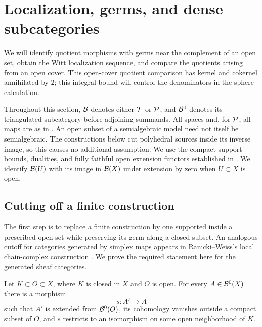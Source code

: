 \section{Localization, germs, and dense subcategories}
\label{sec:localization}

We will identify quotient morphisms with germs near the complement of
an open set, obtain the Witt localization sequence, and compare the
quotients arising from an open cover.  This open-cover quotient
comparison has kernel and cokernel annihilated by $2$; this integral
bound will control the denominators in the sphere calculation.

Throughout this section, $\mathcal B$ denotes either $\mathcal T$ or $\mathcal P$, and
$\mathcal B^0$ denotes its triangulated subcategory before adjoining summands.
All spaces and, for $\mathcal P$, all maps are as in
.  An open subset of a semialgebraic model need
not itself be semialgebraic.  The constructions below cut polyhedral
sources inside its inverse image, so this causes no additional assumption.
We use the compact support bounds, dualities, and fully faithful open
extension functors established in .
We identify $\mathcal B(U)$ with its image in $\mathcal B(X)$ under extension by zero
when $U\subset X$ is open.

\subsection{Cutting off a finite construction}

The first step is to replace a finite construction by one supported
inside a prescribed open set while preserving its germ along a closed
subset.  An analogous cutoff for categories generated by simplex maps
appears in Ranicki--Weiss's local chain-complex construction
\cite[author version, Lemma~4.14 and Corollary~4.15]{RanickiWeiss2010}.
We prove the required statement here for the generated sheaf categories.

\begin{lemma}[Cutoff]
\label{lem:cutoff}
Let $K\subset O\subset X$, where $K$ is closed in $X$ and $O$ is open.
For every $A\in\mathcal B^0(X)$ there is a morphism
\[
 s:A'\longrightarrow A
\]
such that $A'$ is extended from $\mathcal B^0(O)$, its cohomology vanishes
outside a compact subset of $O$, and $s$ restricts to an isomorphism on
some open neighborhood of $K$.
\end{lemma}


